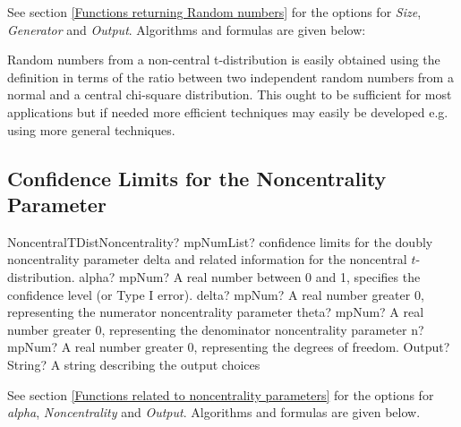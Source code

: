 \vspace{0.3cm}
See section \ref{Functions returning Random numbers} for the options for  {\itshape\sffamily Size},  {\itshape\sffamily Generator} and {\itshape\sffamily Output}. Algorithms and formulas are given below:

\vspace{0.3cm}
Random numbers from a non-central t-distribution is easily obtained using the definition in terms of the ratio between two independent random numbers from a normal and a central chi-square distribution. This ought to be sufficient for most applications but if needed more efficient techniques may easily be developed e.g. using more general techniques.




\subsection{Confidence Limits for the Noncentrality Parameter}
\label{NoncentraltNoncentrality}

\begin{mpFunctionsExtract}
	\mpFunctionFiveNotImplemented
	{NoncentralTDistNoncentrality? mpNumList? confidence limits for the doubly noncentrality parameter delta and related information for the noncentral $t$-distribution.}
	{alpha? mpNum? A real number between 0 and 1, specifies the confidence level (or Type I error).}
	{delta? mpNum? A real number greater 0, representing the numerator noncentrality parameter}
	{theta? mpNum? A real number greater 0, representing the denominator noncentrality parameter}
	{n? mpNum? A real number greater 0, representing the degrees of freedom.}
	{Output? String? A string describing the output choices}
\end{mpFunctionsExtract}


\vspace{0.3cm}
See section \ref{Functions related to noncentrality parameters} for the options for  {\itshape\sffamily alpha}, {\itshape\sffamily Noncentrality} and {\itshape\sffamily Output}. Algorithms and formulas are given below.

